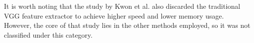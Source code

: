 It is worth noting that the study by Kwon et al.\citep{71kwon2024aesfa} also discarded the traditional VGG\citep{25simonyan2014very} feature extractor to achieve higher speed and lower memory usage. However, the core of that study lies in the other methods employed, so it was not classified under this category.
